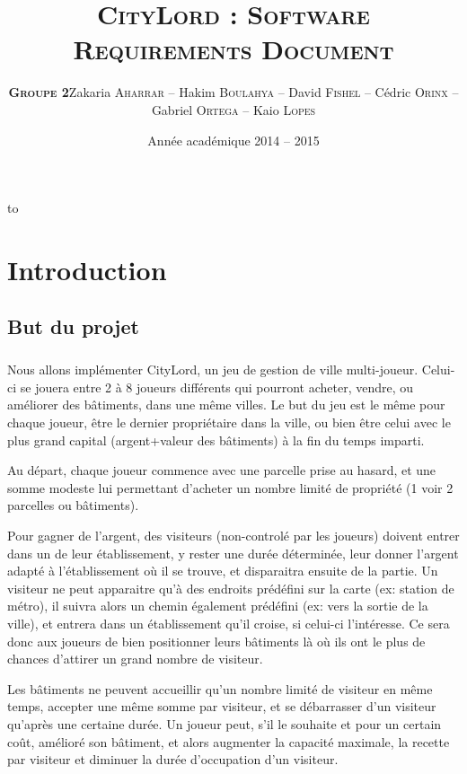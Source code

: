 \documentclass[a4paper,11pt]{report}
\date{Année académique 2014 – 2015}
\title{ \textsc{CityLord} :
\textsc{Software Requirements Document}\\}
\author{\textsc{\textbf{Groupe 2}}\newline Zakaria \textsc{Aharrar} – Hakim \textsc{Boulahya} – David \textsc{Fishel} – Cédric \textsc{Orinx} – Gabriel \textsc{Ortega} – Kaio \textsc{Lopes}}
\makeatletter
\def\clap#1{\hbox to 0pt{\hss #1\hss}}%
\def\haut#1#2#3{%
\hbox to \hsize{%
\rlap{\vtop{\centering #1}}%
\hss
\clap{\vtop{\centering #2}}%
\hss
\llap{\vtop{\centering #3}}}}%
\def\bas#1#2#3{%
\hbox to \hsize{%
\rlap{\vbox{\centering #1}}%
\hss
\clap{\vbox{\centering #2}}%
\hss
\llap{\vbox{\centering #3}}}}%
\def\maketitle{%
\thispagestyle{empty}\vbox to \vsize{%
\haut{}{\@blurb}{}
\vfill
\vspace{1cm}
\begin{flushleft}
\usefont{OT1}{ptm}{m}{n}
\huge \@title
\end{flushleft}
\par
\hrule height 4pt
\par
\begin{flushright}
\usefont{OT1}{phv}{m}{n}
\Large \@author
\par
\end{flushright}
\vspace{1cm}
\vfill
\vfill
\bas{}{\@date}{}
}%
\cleardoublepage
}
\makeatother
\begin{document}
\maketitle
\tableofcontents


\chapter{Introduction}
\section{But du projet}
\paragraph{}
Nous allons implémenter CityLord, un jeu de gestion de ville multi-joueur.
Celui-ci se jouera entre 2 à 8 joueurs différents qui pourront acheter, vendre, ou améliorer des bâtiments, dans une même villes.
Le but du jeu est le même pour chaque joueur, être le dernier propriétaire dans la ville, ou bien être celui avec le plus grand capital (argent+valeur des bâtiments) à la fin du temps imparti.

Au départ, chaque joueur commence avec une parcelle prise au hasard, et une somme modeste lui permettant d'acheter un nombre limité de propriété (1 voir 2 parcelles ou bâtiments).

Pour gagner de l'argent, des visiteurs (non-controlé par les joueurs) doivent entrer dans un de leur établissement, y rester une durée déterminée, leur donner l'argent adapté à l'établissement où il se trouve, et disparaitra ensuite de la partie.
Un visiteur ne peut apparaitre qu'à des endroits prédéfini sur la carte (ex: station de métro), il suivra alors un chemin également prédéfini (ex: vers la sortie de la ville), et entrera dans un établissement qu'il croise, si celui-ci l’intéresse.
Ce sera donc aux joueurs de bien positionner leurs bâtiments là où ils ont le plus de chances d'attirer un grand nombre de visiteur.

Les bâtiments ne peuvent accueillir qu'un nombre limité de visiteur en même temps, accepter une même somme par visiteur, et se débarrasser d'un visiteur qu'après une certaine durée.
Un joueur peut, s'il le souhaite et pour un certain coût, amélioré son bâtiment, et alors augmenter la capacité maximale, la recette par visiteur et diminuer la durée d'occupation d'un visiteur.
\end{document}
